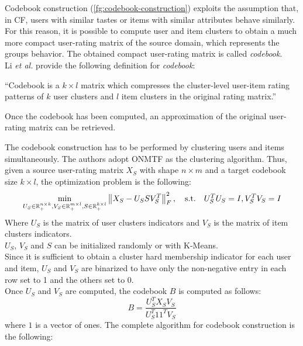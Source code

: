 Codebook construction (\autoref{fg:codebook-construction}) exploits the assumption that, in CF, users with similar tastes or items with similar attributes behave similarly. For this reason, it is possible to compute user and item clusters to obtain a much more compact user-rating matrix of the source domain, which represents the groups behavior. The obtained compact user-rating matrix is called \textit{codebook}.\\
Li \textit{et al.} provide the following definition for \textit{codebook}:
\begin{displayquote}
\enquote{Codebook is a $k \times l$ matrix which compresses the cluster-level user-item rating patterns of $k$ user clusters and $l$ item clusters in the original rating matrix.}
\end{displayquote}
Once the codebook has been computed, an approximation of the original user-rating matrix can be retrieved.\par
The codebook construction has to be performed by clustering users and items simultaneously. The authors adopt ONMTF \cite{10.1145/1150402.1150420} as the clustering algorithm. Thus, given a source user-rating matrix $X_S$ with shape $n \times m$ and a target codebook size $k \times l$, the optimization problem is the following:
\begin{equation}
\min_{U_S \in \mathbb{R}^{n \times k}_+, V_S \in \mathbb{R}^{m \times l}_+, S \in \mathbb{R}^{k \times l}_+} \left\lVert X_S - U_S S V_S^T\right\rVert_F^2, \quad \text{s.t.} \quad U_S^T U_S = I, V_S^T V_S = I
\end{equation}
Where $U_S$ is the matrix of user clusters indicators and $V_S$ is the matrix of item clusters indicators.\\
$U_S$, $V_S$ and $S$ can be initialized randomly or with K-Means.\\
Since it is sufficient to obtain a cluster hard membership indicator for each user and item, $U_S$ and $V_S$ are binarized to have only the non-negative entry in each row set to 1 and the others set to 0.\\
Once $U_S$ and $V_S$ are computed, the codebook $B$ is computed as follows:
\begin{equation}
\label{eq:codebook-construction}
B = \frac{U_S^T X_S V_S}{U_S^T 1 1^T V_S}
\end{equation}
where $1$ is a vector of ones.
The complete algorithm for codebook construction is the following:
\vskip 0.7cm
